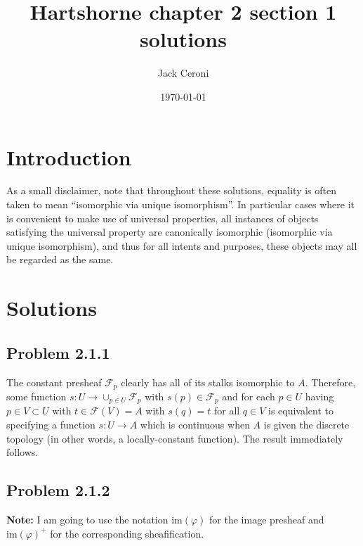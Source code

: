 \documentclass[aps,pra,showpacs,notitlepage,onecolumn,superscriptaddress,nofootinbib]{revtex4-1}
\theoremstyle{definition}
\newcommand{\hhrulefill}{\hspace{-1.5em} \hrulefill}
\begin{document}
\title{Hartshorne chapter 2 section 1 solutions}
\author{Jack Ceroni}
\date{\today}
\maketitle


\tableofcontents

\hhrulefill

\section{Introduction}

\noindent As a small disclaimer, note that throughout these solutions, equality is often taken to mean ``isomorphic via unique isomorphism''. In particular cases where it is convenient to make use of universal properties,
all instances of objects satisfying the universal property are canonically isomorphic (isomorphic via unique isomorphism), and thus for all intents and purposes, these objects may all be regarded
as the same.

\section{Solutions}

\subsection{Problem 2.1.1}

\noindent The constant presheaf $\mathcal{F}_p$ clearly has all of its stalks isomorphic to $A$. Therefore, some function $s : U \to \cup_{p \in U} \mathcal{F}_p$ with $s(p) \in \mathcal{F}_p$ and
for each $p \in U$ having $p \in V \subset U$ with $t \in \mathcal{F}(V) = A$ with $s(q) = t$ for all $q \in V$ is equivalent to specifying a function $s : U \to A$ which is continuous when $A$ is
given the discrete topology (in other words, a locally-constant function). The result immediately follows.

\subsection{Problem 2.1.2}

\noindent \textbf{Note:} I am going to use the notation $\text{im}(\varphi)$ for the image presheaf and $\text{im}(\varphi)^{+}$ for the corresponding sheafification.
\newline
\end{document}
